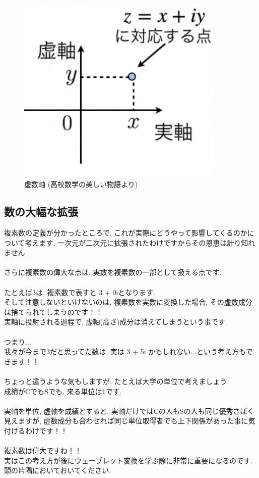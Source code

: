 \documentclass[11pt,a4paper]{jreport}
\begin{document}
\begin{figure}[H]
\label{im:imagine}
  \centering
  \includegraphics[width=100mm,bb=0 0 300 272]{figures/gauss.png}
  \caption{虚数軸 (高校数学の美しい物語より)}
\end{figure}

\subsection{数の大幅な拡張}
複素数の定義が分かったところで, これが実際にどうやって影響してくるのかについて考えます. 一次元が二次元に拡張されたわけですからその恩恵は計り知れません. \\
\\
さらに複素数の偉大な点は, 実数を複素数の一部として扱える点です.\\
\\
たとえば3は, 複素数で表すと 3 + 0iとなります.\\
そして注意しないといけないのは, 複素数を実数に変換した場合, その虚数成分は捨てられてしまうのです！！\\
実軸に投射される過程で, 虚軸(高さ)成分は消えてしまうという事です.\\
\\
つまり...\\
我々が今まで3だと思ってた数は, 実は 3 + 5i かもしれない...という考え方もできます！！\\
\\
ちょっと違うような気もしますが, たとえば大学の単位で考えましょう.\\
成績がCでもSでも, 来る単位は1です.\\
\\
実軸を単位, 虚軸を成績とすると, 実軸だけではCの人もSの人も同じ優秀さぽく見えますが, 虚数成分も合わせれば同じ単位取得者でも上下関係があった事に気付けるわけです！！\\
\\
複素数は偉大ですね！！
\\
実はこの考え方が後にウェーブレット変換を学ぶ際に非常に重要になるのです. 頭の片隅においておいてください.\\
\end{document}
